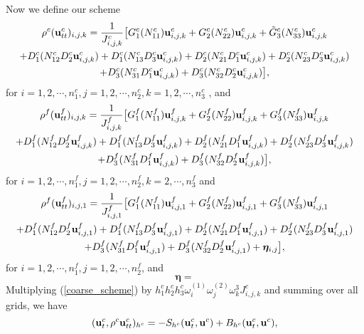 \documentclass[a4paper]{article}
\begin{document}
Now we define our scheme
\begin{multline}\label{coarse_scheme}
\rho^c ({\bf u}_{tt}^c)_{i,j,k} = \frac{1}{J_{i,j,k}^c}\big[G_1^c(N_{11}^c){\bf u}_{i,j,k}^c+G_2^c(N_{22}^c){\bf u}_{i,j,k}^c+\tilde{G}_3^c(N_{33}^c){\bf u}_{i,j,k}^c\\
+D_1^c(N_{12}^cD_2^c{\bf u}_{i,j,k}^c)+D_1^c(N_{13}^cD_3^c{\bf u}_{i,j,k}^c)+D_2^c(N_{21}^cD_1^c{\bf u}_{i,j,k}^c)+D_2^c(N_{23}^cD_3^c{\bf u}_{i,j,k}^c)\\
+D_3^c(N_{31}^cD_1^c{\bf u}_{i,j,k}^c)+D_3^c(N_{32}^cD_2^c{\bf u}_{i,j,k}^c)\big],
\end{multline}
for $ i = 1,2,\cdots,n_1^c, j = 1,2,\cdots,n_2^c, k = 1,2,\cdots,n_3^c$ , and 
\begin{multline}\label{fine_scheme_2}
\rho^f ({\bf u}_{tt}^f)_{i,j,k} =
 \frac{1}{J_{i,j,k}^f}\big[G_1^f(N_{11}^f){\bf u}_{i,j,k}^f+G_2^f(N_{22}^f){\bf u}_{i,j,k}^f+G_3^f(N_{33}^f){\bf u}_{i,j,k}^f\\
+D_1^f(N_{12}^fD_2^f{\bf u}_{i,j,k}^f)+D_1^f(N_{13}^fD_3^f{\bf u}_{i,j,k}^f)
+D_2^f(N_{21}^fD_1^f{\bf u}_{i,j,k}^f)+D_2^f(N_{23}^fD_3^f{\bf u}_{i,j,k}^f)\\
+D_3^f(N_{31}^fD_1^f{\bf u}_{i,j,k}^f)
+D_3^f(N_{32}^fD_2^f{\bf u}_{i,j,k}^f)\big],
\end{multline}
for $ i = 1,2,\cdots,n_1^f, j = 1,2,\cdots,n_2^f, k = 2,\cdots,n_3^f$ and
\begin{multline}\label{fine_scheme_1}
\rho^f ({\bf u}_{tt}^f)_{i,j,1} = \frac{1}{J_{i,j,1}^f}\big[G_1^f(N_{11}^f){\bf u}_{i,j,1}^f+G_2^f(N_{22}^f){\bf u}_{i,j,1}^f+G_3^f(N_{33}^f){\bf u}_{i,j,1}^f\\
+D_1^f(N_{12}^fD_2^f{\bf u}_{i,j,1}^f)+D_1^f(N_{13}^fD_3^f{\bf u}_{i,j,1}^f)+D_2^f(N_{21}^fD_1^f{\bf u}_{i,j,1}^f)+D_2^f(N_{23}^fD_3^f{\bf u}_{i,j,1}^f)\\
+D_3^f(N_{31}^fD_1^f{\bf u}_{i,j,1}^f)+D_3^f(N_{32}^fD_2^f{\bf u}_{i,j,1}^f)+{\bm \eta}_{i,j}\big],
\end{multline}
for $ i = 1,2,\cdots,n_1^f, j = 1,2,\cdots,n_2^f$, and
\begin{equation*}
{\bm \eta} = 
\end{equation*}
Multiplying (\ref{coarse_scheme}) by $h_1^ch_2^ch_3^c\omega_i^{(1)}\omega_j^{(2)}\omega_k^{3}J_{i,j,k}^c$ and summing over all grids, we have
\begin{equation}\label{coarse_simple}
({\bf u}_t^c, \rho^c{\bf u}_{tt}^c)_{h^c} = -S_{h^c}({\bf u}_t^c,{\bf u}^c) + B_{h^c}({\bf u}_t^c,{\bf u}^c),
\end{equation}
\end{document}
